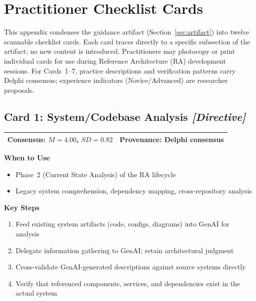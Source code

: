 
\section[Appendix - Practitioner Checklist Cards]{Practitioner Checklist Cards}\label{app:checklists}

This appendix condenses the guidance artifact (Section~\ref{sec:artifact}) into
twelve scannable checklist cards. Each card traces directly to a specific
subsection of the artifact; no new content is introduced. Practitioners may
photocopy or print individual cards for use during Reference Architecture (RA)
development sessions. For Cards~1--7, practice descriptions and verification
patterns carry Delphi consensus; experience indicators (Novice/Advanced) are
researcher proposals.

\clearpage
\subsection*{Card 1: System/Codebase Analysis \hfill \textit{[Directive]}}

\begin{tabular}{|p{7cm}|p{6cm}|}
    \hline
    \textbf{Consensus:} $M = 4.00$, $SD = 0.82$ & \textbf{Provenance:} Delphi consensus \\
    \hline
\end{tabular}

\vspace{0.5em}
\textbf{When to Use}
\begin{itemize}
    \item Phase~2 (Current State Analysis) of the RA lifecycle
    \item Legacy system comprehension, dependency mapping, cross-repository analysis
\end{itemize}

\textbf{Key Steps}
\begin{enumerate}
    \item Feed existing system artifacts (code, configs, diagrams) into GenAI for analysis
    \item Delegate information gathering to GenAI; retain architectural judgment
    \item Cross-validate GenAI-generated descriptions against source systems directly
    \item Verify that referenced components, services, and dependencies exist in the actual system
\end{enumerate}

